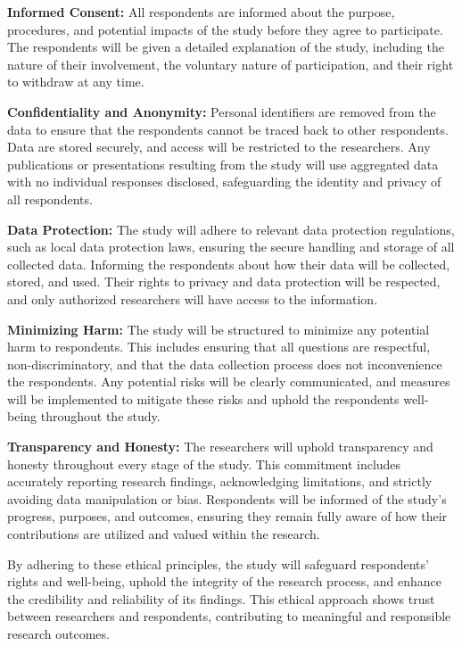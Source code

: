 	\textbf{Informed Consent:} All respondents are informed about the purpose, procedures, and potential impacts of the study before they agree to participate. The respondents will be given a detailed explanation of the study, including the nature of their involvement, the voluntary nature of participation, and their right to withdraw at any time.
	
	\textbf{Confidentiality and Anonymity:} Personal identifiers are removed from the data to ensure that the respondents cannot be traced back to other respondents. Data are stored securely, and access will be restricted to the researchers. Any publications or presentations resulting from the study will use aggregated data with no individual responses disclosed, safeguarding the identity and privacy of all respondents.
	
	\textbf{Data Protection:} The study will adhere to relevant data protection regulations, such as local data protection laws, ensuring the secure handling and storage of all collected data. Informing the respondents about how their data will be collected, stored, and used. Their rights to privacy and data protection will be respected, and only authorized researchers will have access to the information.
	
	\textbf{Minimizing Harm:} The study will be structured to minimize any potential harm to respondents. This includes ensuring that all questions are respectful, non-discriminatory, and that the data collection process does not inconvenience the respondents. Any potential risks will be clearly communicated, and measures will be implemented to mitigate these risks and uphold the respondents well-being throughout the study.
	
	\textbf{Transparency and Honesty: } The researchers will uphold transparency and honesty throughout every stage of the study. This commitment includes accurately reporting research findings, acknowledging limitations, and strictly avoiding data manipulation or bias. Respondents will be informed of the study's progress, purposes, and outcomes, ensuring they remain fully aware of how their contributions are utilized and valued within the research.
	
	By adhering to these ethical principles, the study will safeguard respondents' rights and well-being, uphold the integrity of the research process, and enhance the credibility and reliability of its findings. This ethical approach shows trust between researchers and respondents, contributing to meaningful and responsible research outcomes.
